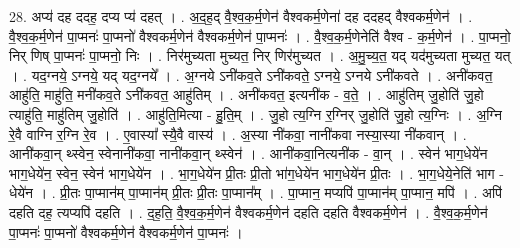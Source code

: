 \documentclass[17pt]{extarticle}
\begin{document}
28. अप्य॑ दह ददह॒ दप्य प्य॑ दहत् । . अ॒द॒ह॒द् वै॒श्व॒क॒र्म॒णेन॑ वैश्वकर्म॒णेना॑ दह ददहद् वैश्वकर्म॒णेन॑ । . वै॒श्व॒क॒र्म॒णेन॑ पा॒प्मनः॑ पा॒प्मनो॑ वैश्वकर्म॒णेन॑ वैश्वकर्म॒णेन॑ पा॒प्मनः॑ । . वै॒श्व॒क॒र्म॒णेनेति॑ वैश्व - क॒र्म॒णेन॑ । . पा॒प्मनो॒ निर् णिष् पा॒प्मनः॑ पा॒प्मनो॒ निः । . निर॑मुच्यता मुच्यत॒ निर् णिर॑मुच्यत । . अ॒मु॒च्य॒त॒ यद् यद॑मुच्यता मुच्यत॒ यत् । . यद॒ग्नये॒ ऽग्नये॒ यद् यद॒ग्नये᳚ । . अ॒ग्नये ऽनी॑कव॒ते ऽनी॑कवते॒ ऽग्नये॒ ऽग्नये ऽनी॑कवते । . अनी॑कवत॒ आहु॑ति॒ माहु॑ति॒ मनी॑कव॒ते ऽनी॑कवत॒ आहु॑तिम् । . अनी॑कवत॒ इत्यनी॑क - व॒ते॒ । . आहु॑तिम् जु॒होति॑ जु॒हो त्याहु॑ति॒ माहु॑तिम् जु॒होति॑ । . आहु॑ति॒मित्या - हु॒ति॒म् । . जु॒हो त्य॒ग्नि र॒ग्निर् जु॒होति॑ जु॒हो त्य॒ग्निः । . अ॒ग्नि रे॒वै वाग्नि र॒ग्नि रे॒व । . ए॒वास्या᳚ स्यै॒वै वास्य॑ । . अ॒स्या नी॑कवा॒ नानी॑कवा नस्या॒स्या नी॑कवान् । . आनी॑कवा॒न् थ्स्वेन॒ स्वेनानी॑कवा॒ नानी॑कवा॒न् थ्स्वेन॑ । . आनी॑कवा॒नित्यनी॑क - वा॒न् । . स्वेन॑ भाग॒धेये॑न भाग॒धेये॑न॒ स्वेन॒ स्वेन॑ भाग॒धेये॑न । . भा॒ग॒धेये॑न प्री॒तः प्री॒तो भा॑ग॒धेये॑न भाग॒धेये॑न प्री॒तः । . भा॒ग॒धेये॒नेति॑ भाग - धेये॑न । . प्री॒तः पा॒प्मान॑म् पा॒प्मान॑म् प्री॒तः प्री॒तः पा॒प्मान᳚म् । . पा॒प्मान॒ मप्यपि॑ पा॒प्मान॑म् पा॒प्मान॒ मपि॑ । . अपि॑ दहति दह॒ त्यप्यपि॑ दहति । . द॒ह॒ति॒ वै॒श्व॒क॒र्म॒णेन॑ वैश्वकर्म॒णेन॑ दहति दहति वैश्वकर्म॒णेन॑ । . वै॒श्व॒क॒र्म॒णेन॑ पा॒प्मनः॑ पा॒प्मनो॑ वैश्वकर्म॒णेन॑ वैश्वकर्म॒णेन॑ पा॒प्मनः॑ । \newline
\end{document}

